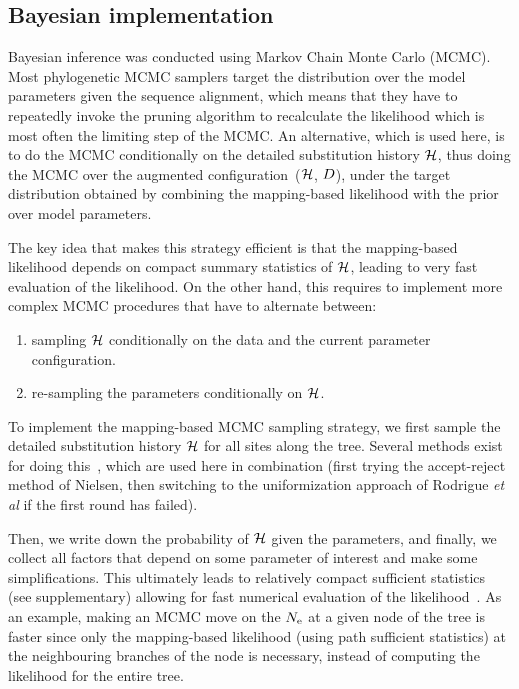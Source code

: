 \documentclass{MBE}
\begin{document}
	\subsection{Bayesian implementation}
	\label{sec:Bayesian}
	Bayesian inference was conducted using Markov Chain Monte Carlo (MCMC).
	Most phylogenetic {MCMC} samplers target the distribution over the model parameters given the sequence alignment, which means that they have to repeatedly invoke the pruning algorithm to recalculate the {likelihood} which is most often the limiting step of the {MCMC}.
	An alternative, which is used here, is to do the {MCMC} conditionally on the detailed {substitution} history $\mathcal{H}$, thus doing the {MCMC} over the augmented configuration~($\mathcal{H}$, $D$), under the target distribution obtained by combining the mapping-based {likelihood} with the {prior} over model parameters.

	The key idea that makes this strategy efficient is that the mapping-based {likelihood} depends on compact summary statistics of $\mathcal{H}$, leading to very fast evaluation of the {likelihood}.
	On the other hand, this requires to implement more complex {MCMC} procedures that have to alternate between:
	\begin{enumerate}
		\item sampling $\mathcal{H}$ conditionally on the data and the current parameter configuration.
		\item re-sampling the parameters conditionally on $\mathcal{H}$.
	\end{enumerate}

	To implement the mapping-based {MCMC} sampling strategy, we first sample the detailed {substitution} history $\mathcal{H}$ for all sites along the tree.
	Several methods exist for doing this~\citep{Nielsen2002,Rodrigue2008}, which are used here in combination (first trying the accept-reject method of Nielsen, then switching to the uniformization approach of Rodrigue \textit{et al} if the first round has failed).

	Then, we write down the probability of $\mathcal{H}$ given the parameters, and finally, we collect all factors that depend on some parameter of interest and make some simplifications.
	This ultimately leads to relatively compact sufficient statistics (see supplementary) allowing for fast numerical evaluation of the likelihood~\citep{Irvahn2014,Davydov2016}.
	As an example, making an {MCMC} move on the $N_{\text{e}}$ at a given node of the tree is faster since only the mapping-based {likelihood} (using path sufficient statistics) at the neighbouring branches of the node is necessary, instead of computing the likelihood for the entire tree.
\end{document}
